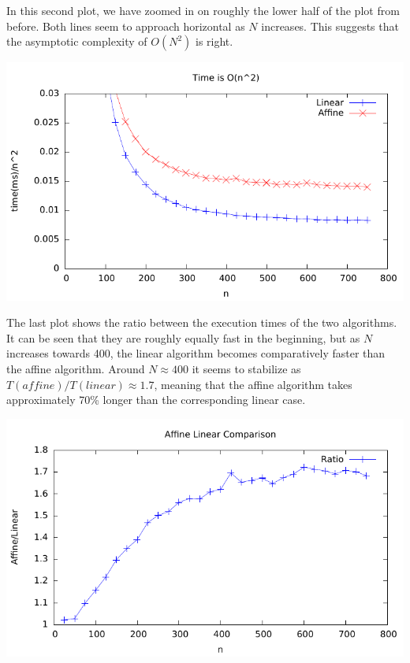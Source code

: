 In this second plot, we have zoomed in on roughly the lower half of
the plot from before. Both lines seem to approach horizontal as $N$
increases. This suggests that the asymptotic complexity of $O(N^2)$ is
right.
\begin{center}
	\includegraphics[width=\textwidth]{../plots/plot2.pdf}
\end{center}

The last plot shows the ratio between the execution times of the two
algorithms. It can be seen that they are roughly equally fast in the
beginning, but as $N$ increases towards 400, the linear algorithm
becomes comparatively faster than the affine algorithm. Around $N
\approx 400$ it seems to stabilize as $T(affine)/T(linear) \approx
1.7$, meaning that the affine algorithm takes approximately 70\%
longer than the corresponding linear case.
\begin{center}
	\includegraphics[width=\textwidth]{../plots/plot3.pdf}
\end{center}

